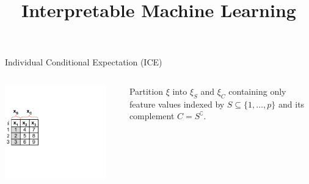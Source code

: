 \documentclass[11pt,compress,t,notes=noshow, aspectratio=169, xcolor=table]{beamer}
\title{Interpretable Machine Learning}
\date{}
\begin{document}
\newcommand{\titlefigure}{figure/feature-effect}
\newcommand{\learninggoals}{
\item Intro to feature effects
\item ICE plots
}



\begin{frame}{Individual Conditional Expectation (ICE)}

\begin{columns}[T]
\begin{column}{0.18\textwidth} %
\includegraphics[page=1, trim=0cm 0.35cm 4.53cm 0.35cm, clip, width=0.9\textwidth]{figure_man/ice_plot_demo}
\end{column}
\begin{column}{0.82\textwidth}


Partition $\xi$ into $\xi_S$ and $\xi_C$ containing only feature values indexed by $S \subseteq \{1, \dots, p\}$ and its complement $C = S^\complement$.
\lz


\end{column}
\end{columns}
\end{frame}
\end{document}
